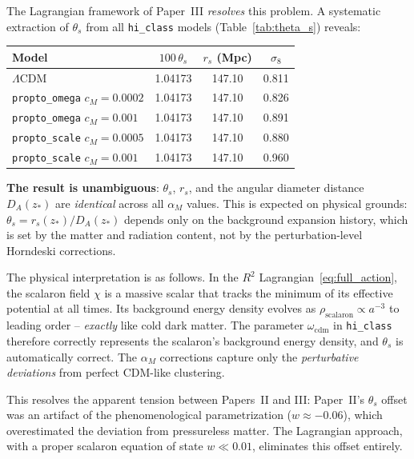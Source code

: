 \documentclass[aps,prd,twocolumn,superscriptaddress,nofootinbib]{revtex4-2}
\begin{document}
The Lagrangian framework of Paper~III \textit{resolves} this problem. A systematic extraction of $\theta_s$ from all \texttt{hi\_class} models (Table~\ref{tab:theta_s}) reveals:

\begin{center}
\begin{tabular}{lccc}
\toprule
\textbf{Model} & $100\,\theta_s$ & $r_s$ (Mpc) & $\sigma_8$ \\
\midrule
$\Lambda$CDM & 1.04173 & 147.10 & 0.811 \\
\texttt{propto\_omega} $c_M = 0.0002$ & 1.04173 & 147.10 & 0.826 \\
\texttt{propto\_omega} $c_M = 0.001$ & 1.04173 & 147.10 & 0.891 \\
\texttt{propto\_scale} $c_M = 0.0005$ & 1.04173 & 147.10 & 0.880 \\
\texttt{propto\_scale} $c_M = 0.001$ & 1.04173 & 147.10 & 0.960 \\
\bottomrule
\end{tabular}
\label{tab:theta_s}
\end{center}

\textbf{The result is unambiguous}: $\theta_s$, $r_s$, and the angular diameter distance $D_A(z_*)$ are \textit{identical} across all $\alpha_M$ values. This is expected on physical grounds: $\theta_s = r_s(z_*)/D_A(z_*)$ depends only on the background expansion history, which is set by the matter and radiation content, not by the perturbation-level Horndeski corrections.

The physical interpretation is as follows. In the $R^2$ Lagrangian~\eqref{eq:full_action}, the scalaron field $\chi$ is a massive scalar that tracks the minimum of its effective potential at all times. Its background energy density evolves as $\rho_{\mathrm{scalaron}} \propto a^{-3}$ to leading order -- \textit{exactly} like cold dark matter. The parameter $\omega_{\mathrm{cdm}}$ in \texttt{hi\_class} therefore correctly represents the scalaron's background energy density, and $\theta_s$ is automatically correct. The $\alpha_M$ corrections capture only the \textit{perturbative deviations} from perfect CDM-like clustering.

This resolves the apparent tension between Papers~II and III: Paper~II's $\theta_s$ offset was an artifact of the phenomenological parametrization ($w \approx -0.06$), which overestimated the deviation from pressureless matter. The Lagrangian approach, with a proper scalaron equation of state $w \ll 0.01$, eliminates this offset entirely.
\end{document}
